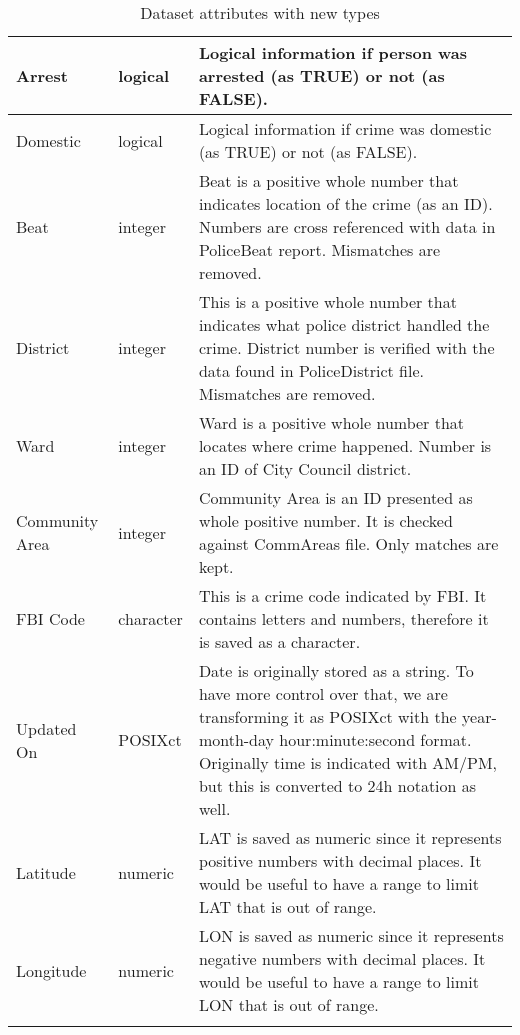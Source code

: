 \begin{center}
\begin{longtable}{|m{6em}|m{7em}|m{18em}|}
        \hline
            Arrest & 
            logical & 
            Logical information if person was arrested (as TRUE) or not (as FALSE).\\
        \hline
            Domestic & 
            logical & 
            Logical information if crime was domestic (as TRUE) or not (as FALSE).\\
        \hline
            Beat & 
            integer & 
            Beat is a positive whole number that indicates location of the crime (as an ID). Numbers are cross referenced with data in PoliceBeat report. Mismatches are removed.\\
        \hline
            District & 
            integer & 
            This is a positive whole number that indicates what police district handled the crime. District number is verified with the data found in PoliceDistrict file. Mismatches are removed.\\
        \hline
            Ward & 
            integer & 
            Ward is a positive whole number that locates where crime happened. Number is an ID of City Council district.\\
        \hline
            Community Area & 
            integer & 
            Community Area is an ID presented as whole positive number. It is checked against CommAreas file. Only matches are kept.\\
        \hline
            FBI Code & 
            character & 
            This is a crime code indicated by FBI. It contains letters and numbers, therefore it is saved as a character.\\
        \hline
            Updated On & 
            POSIXct & 
            Date is originally stored as a string. To have more control over that, we are transforming it as POSIXct with the year-month-day hour:minute:second format. Originally time is indicated with AM/PM, but this is converted to 24h notation as well.\\
        \hline
            Latitude & 
            numeric & 
            LAT is saved as numeric since it represents positive numbers with decimal places. It would be useful to have a range to limit LAT that is out of range.\\
        \hline
            Longitude & 
            numeric & 
            LON is saved as numeric since it represents negative numbers with decimal places. It would be useful to have a range to limit LON that is out of range.\\
        \hline
    \caption{Dataset attributes with new types}
\end{longtable}
\end{center}





